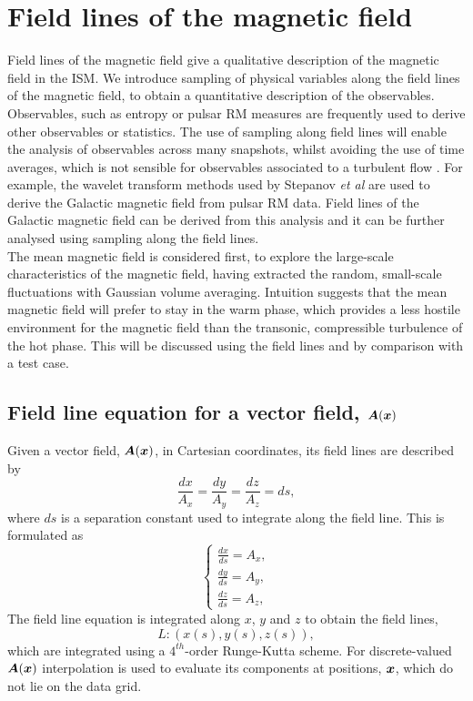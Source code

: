 \documentclass[useAMS,usenatbib]{mn2e}
\begin{document}
\section[]{Field lines of the magnetic field}
Field lines of the magnetic field give a qualitative description of the magnetic field in the ISM. We introduce sampling of physical variables along the field lines of the magnetic field, to obtain a quantitative description of the observables. Observables, such as entropy or pulsar RM measures \citep{st02} are frequently used to derive other observables or statistics.  The use of sampling along field lines will enable the analysis of observables across many snapshots, whilst avoiding the use of time averages, which is not sensible for observables associated to a turbulent flow \citep{tnl}. For example, the wavelet transform methods used by Stepanov \textsl{et al} \citep{st02} are used to derive the Galactic magnetic field from pulsar RM data. Field lines of the Galactic magnetic field can be derived from this analysis and it can be further analysed using sampling along the field lines.\\
The mean magnetic field is considered first, to explore the large-scale characteristics of the magnetic field, having extracted the random, small-scale fluctuations with Gaussian volume averaging.  Intuition suggests that the mean magnetic field will prefer to stay in the warm phase, which provides a less hostile environment for the magnetic field than the transonic, compressible turbulence of the hot phase. This will be discussed using the field lines and by comparison with a test case.
\boldmath
\subsection{Field line equation for a vector field, $\boldsymbol{A}(\boldsymbol{x})$}
\unboldmath
Given a vector field, $\boldsymbol{A}(\boldsymbol{x})$, in Cartesian coordinates, its field lines are described by
\begin{equation}
\frac{dx}{A_{x}}=\frac{dy}{A_{y}}=\frac{dz}{A_{z}}=ds,
\label{f_lines_eqn}
\end{equation}
where $ds$ is a separation constant used to integrate along the field line. This is formulated as
\begin{equation}
\begin{cases}
\frac{dx}{ds}=A_x,\\
\frac{dy}{ds}=A_y,\\
\frac{dz}{ds}=A_z,
\end{cases}
\label{fld_eqns}
\end{equation}
 The field line equation is integrated along $x$, $y$ and $z$ to obtain the field lines,
\[L: (x(s),y(s),z(s)),\]
which are integrated using a $4^{th}$-order Runge-Kutta scheme. For discrete-valued $\boldsymbol{A}(\boldsymbol{x})$ interpolation is used to evaluate its components at positions, $\boldsymbol{x}$, which do not lie on the data grid. 
\end{document}
